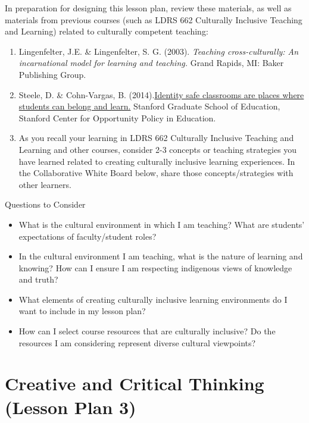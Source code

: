 \documentclass[
]{book}
\providecommand{\tightlist}{%
  \setlength{\itemsep}{0pt}\setlength{\parskip}{0pt}}
\begin{document}
\begin{reflect}
In preparation for designing this lesson plan, review these materials, as well as materials from previous courses (such as LDRS 662 Culturally Inclusive Teaching and Learning) related to culturally competent teaching:

\begin{enumerate}
\def\labelenumi{\arabic{enumi}.}
\item
  Lingenfelter, J.E. \& Lingenfelter, S. G. (2003). \emph{Teaching cross-culturally: An incarnational model for learning and teaching.} Grand Rapids, MI: Baker Publishing Group.
\item
  Steele, D. \& Cohn-Vargas, B. (2014).\href{https://edpolicy.stanford.edu/library/video/1196}{Identity safe classrooms are places where students can belong and learn.} Stanford Graduate School of Education, Stanford Center for Opportunity Policy in Education.
\item
  As you recall your learning in LDRS 662 Culturally Inclusive Teaching and Learning and other courses, consider 2-3 concepts or teaching strategies you have learned related to creating culturally inclusive learning experiences. In the Collaborative White Board below, share those concepts/strategies with other learners.
\end{enumerate}

{Questions to Consider}

\begin{itemize}
\tightlist
\item
  What is the cultural environment in which I am teaching? What are students' expectations of faculty/student roles?\\
\item
  In the cultural environment I am teaching, what is the nature of learning and knowing? How can I ensure I am respecting indigenous views of knowledge and truth?\\
\item
  What elements of creating culturally inclusive learning environments do I want to include in my lesson plan?\\
\item
  How can I select course resources that are culturally inclusive? Do the resources I am considering represent diverse cultural viewpoints?
\end{itemize}
\end{reflect}

\hypertarget{creative-and-critical-thinking-lesson-plan-3}{%
\section{Creative and Critical Thinking (Lesson Plan 3)}\label{creative-and-critical-thinking-lesson-plan-3}}
\end{document}
